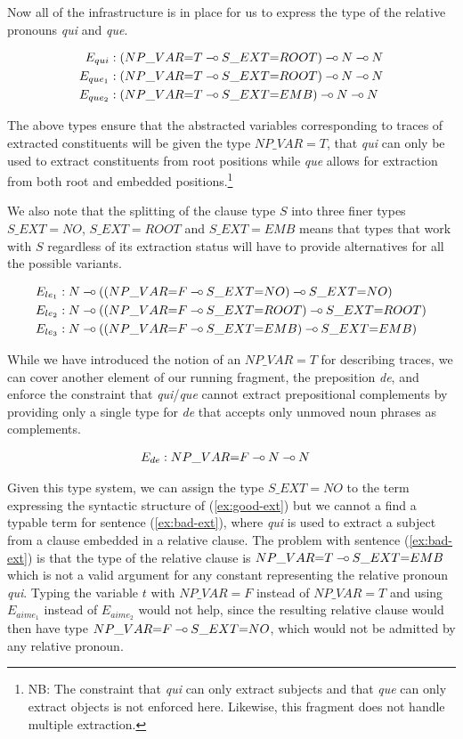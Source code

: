 Now all of the infrastructure is in place for us to express the type of
the relative pronouns \emph{qui} and \emph{que}.

\begin{align*}
E_{qui} &: (NP\_VAR{=}T \mathbin{{-}\mkern-3.5mu{\circ}} S\_EXT{=}ROOT) \mathbin{{-}\mkern-3.5mu{\circ}} N \mathbin{{-}\mkern-3.5mu{\circ}} N \\
E_{que_1} &: (NP\_VAR{=}T \mathbin{{-}\mkern-3.5mu{\circ}} S\_EXT{=}ROOT) \mathbin{{-}\mkern-3.5mu{\circ}} N \mathbin{{-}\mkern-3.5mu{\circ}} N \\
E_{que_2} &: (NP\_VAR{=}T \mathbin{{-}\mkern-3.5mu{\circ}} S\_EXT{=}EMB) \mathbin{{-}\mkern-3.5mu{\circ}} N \mathbin{{-}\mkern-3.5mu{\circ}} N
\end{align*}

The above types ensure that the abstracted variables corresponding to
traces of extracted constituents will be given the type $NP\_VAR{=}T$,
that \emph{qui} can only be used to extract constituents from root
positions while \emph{que} allows for extraction from both root and
embedded positions.\footnote{NB: The constraint that \emph{qui} can only
  extract subjects and that \emph{que} can only extract objects is not
  enforced here. Likewise, this fragment does not handle multiple
  extraction.}

We also note that the splitting of the clause type $S$ into three finer
types $S\_EXT{=}NO$, $S\_EXT{=}ROOT$ and $S\_EXT{=}EMB$ means that types
that work with $S$ regardless of its extraction status will have to
provide alternatives for all the possible variants.

\begin{align*}
E_{le_1} &: N \mathbin{{-}\mkern-3.5mu{\circ}} ((NP\_VAR{=}F \mathbin{{-}\mkern-3.5mu{\circ}} S\_EXT{=}NO) \mathbin{{-}\mkern-3.5mu{\circ}} S\_EXT{=}NO) \\
E_{le_2} &: N \mathbin{{-}\mkern-3.5mu{\circ}} ((NP\_VAR{=}F \mathbin{{-}\mkern-3.5mu{\circ}} S\_EXT{=}ROOT) \mathbin{{-}\mkern-3.5mu{\circ}} S\_EXT{=}ROOT) \\
E_{le_3} &: N \mathbin{{-}\mkern-3.5mu{\circ}} ((NP\_VAR{=}F \mathbin{{-}\mkern-3.5mu{\circ}} S\_EXT{=}EMB) \mathbin{{-}\mkern-3.5mu{\circ}} S\_EXT{=}EMB)
\end{align*}

While we have introduced the notion of an $NP\_VAR{=}T$ for describing
traces, we can cover another element of our running fragment, the
preposition \emph{de}, and enforce the constraint that
\emph{qui}/\emph{que} cannot extract prepositional complements by
providing only a single type for \emph{de} that accepts only unmoved
noun phrases as complements.

\begin{align*}
E_{de} &: NP\_VAR{=}F \mathbin{{-}\mkern-3.5mu{\circ}} N \mathbin{{-}\mkern-3.5mu{\circ}} N
\end{align*}

Given this type system, we can assign the type $S\_EXT{=}NO$ to the term
expressing the syntactic structure of (\ref{ex:good-ext}) but we cannot
a find a typable term for sentence (\ref{ex:bad-ext}), where \emph{qui}
is used to extract a subject from a clause embedded in a relative
clause.  The problem with sentence (\ref{ex:bad-ext}) is that the type
of the relative clause is $NP\_VAR{=}T \mathbin{{-}\mkern-3.5mu{\circ}} S\_EXT{=}EMB$ which is not
a valid argument for any constant representing the relative pronoun
\emph{qui}. Typing the variable $t$ with $NP\_VAR{=}F$ instead of
$NP\_VAR{=}T$ and using $E_{aime_1}$ instead of $E_{aime_2}$ would not
help, since the resulting relative clause would then have type
$NP\_VAR{=}F \mathbin{{-}\mkern-3.5mu{\circ}} S\_EXT{=}NO$, which would not be admitted by any
relative pronoun.


